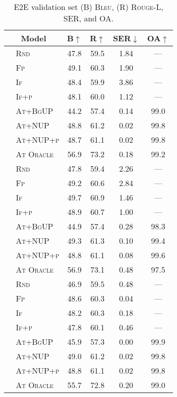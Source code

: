\begin{table}[t!]
\begin{tabular}{ll cccc}
    \toprule
    \multicolumn{2}{c}{Model}  &    B$\uparrow$ & R$\uparrow$ & SER$\downarrow$ & OA$\uparrow$    \\
    \midrule
    \parbox[t]{2mm}{}
     & \textsc{\small{Rnd}} &  47.8&59.5&1.84&--- \\
     & \textsc{\small{Fp}} &  49.1&60.3&1.90&--- \\
     & \textsc{\small{If}} &  48.4&59.9&3.86&--- \\
     & \textsc{\small{If+p}} &  48.1&60.0&1.12&--- \\
     & \textsc{\small{At+BgUP}} &  44.2&57.4&0.14&99.0 \\
     & \textsc{\small{At+NUP}} &  48.8&61.2&0.02&99.8 \\
     & \textsc{\small{At+NUP+p}} &  48.7&61.1&0.02&99.8 \\
     & \textsc{\small{At Oracle}} &  56.9&73.2&0.18&99.2 \\
    \midrule
    \parbox[t]{2mm}{}
     & \textsc{\small{Rnd}} &  47.8&59.4&2.26&--- \\
     & \textsc{\small{Fp}} &  49.2&60.6&2.84&--- \\
     & \textsc{\small{If}} &  49.7&60.9&1.46&--- \\
     & \textsc{\small{If+p}} &  48.9&60.7&1.00&--- \\
     & \textsc{\small{At+BgUP}} &  44.9&57.4&0.28&98.3 \\
     & \textsc{\small{At+NUP}} &  49.3&61.3&0.10&99.4 \\
     & \textsc{\small{At+NUP+p}} &  48.8&61.1&0.08&99.6 \\
     & \textsc{\small{At Oracle}} &  56.9&73.1&0.48&97.5 \\
    \midrule
    \parbox[t]{2mm}{}
     & \textsc{\small{Rnd}} &  46.9&59.5&0.48&--- \\
     & \textsc{\small{Fp}} &  48.6&60.3&0.04&--- \\
     & \textsc{\small{If}} &  48.2&60.3&0.18&--- \\
     & \textsc{\small{If+p}} &  47.8&60.1&0.46&--- \\
     & \textsc{\small{At+BgUP}} &  45.9&57.3&0.00&99.9 \\
     & \textsc{\small{At+NUP}} &  49.0&61.2&0.02&99.8 \\
     & \textsc{\small{At+NUP+p}} &  48.8&61.1&0.02&99.8 \\
     & \textsc{\small{At Oracle}} &  55.7&72.8&0.20&99.0 \\
    \bottomrule
\end{tabular}


    \caption{E2E validation set (B) \textsc{Bleu}, (R) \textsc{Rouge-L},
    SER, and OA.}
    \label{tab:app.e2e.valid.agg}
\end{table}

